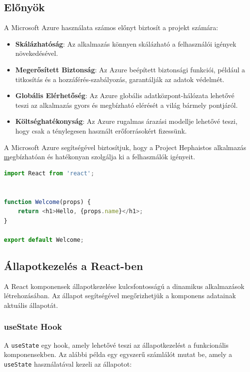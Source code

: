 \documentclass[colorlinks]{thesis-kando}
\theoremstyle{definition}
\theoremstyle{remark}
\begin{document}
\subsection*{Előnyök}
A Microsoft Azure használata számos előnyt biztosít a projekt számára:
\begin{itemize}
    \item \textbf{Skálázhatóság}: Az alkalmazás könnyen skálázható a felhasználói igények növekedésével.
    \item \textbf{Megerősített Biztonság}: Az Azure beépített biztonsági funkciói, például a titkosítás és a hozzáférés-szabályozás, garantálják az adatok védelmét.
    \item \textbf{Globális Elérhetőség}: Az Azure globális adatközpont-hálózata lehetővé teszi az alkalmazás gyors és megbízható elérését a világ bármely pontjáról.
    \item \textbf{Költséghatékonyság}: Az Azure rugalmas árazási modellje lehetővé teszi, hogy csak a ténylegesen használt erőforrásokért fizessünk.
\end{itemize}

A Microsoft Azure segítségével biztosítjuk, hogy a Project Hephaistos alkalmazás \href{https://projecthephaistos.azurewebsites.net/index.html} megbízhatóan és hatékonyan szolgálja ki a felhasználók igényeit.

\pagebreak

\begin{lstlisting}[language=JavaScript]
import React from 'react';


function Welcome(props) {
    return <h1>Hello, {props.name}</h1>;
}

export default Welcome;
\end{lstlisting}

\subsection{Állapotkezelés a React-ben}
A React komponensek állapotkezelése kulcsfontosságú a dinamikus alkalmazások létrehozásában. Az állapot segítségével megőrizhetjük a komponens adatainak aktuális állapotát.

\subsubsection{useState Hook}
A \texttt{useState} egy hook, amely lehetővé teszi az állapotkezelést a funkcionális komponensekben. Az alábbi példa egy egyszerű számlálót mutat be, amely a \texttt{useState} használatával kezeli az állapotot:
\end{document}

